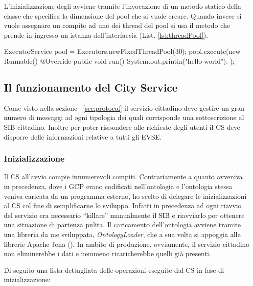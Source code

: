L'inizializzazione degli  avviene tramite l'invocazione di un metodo statico della classe  che specifica la dimensione del pool che si vuole creare. Quando invece si vuole assegnare un compito ad uno dei thread del pool si usa il metodo  che prende in ingresso un istanza dell'interfaccia  (List. \ref{lst:threadPool}).

\begin{java}[caption={Creazione Pool di Thread},label={lst:threadPool}]
ExecutorService pool = Executors.newFixedThreadPool(30);
pool.execute(new Runnable() {
	@Override
	public void run() {
		System.out.println("hello world");
	}
});
\end{java}

\subsection{Il funzionamento del City Service}
 
Come visto nella sezione ~\ref{sec:protocol} il servizio cittadino deve gestire un gran numero di messaggi ad ogni tipologia dei quali corrisponde una sottoscrizione al SIB cittadino. Inoltre per poter rispondere alle richieste degli utenti il CS deve disporre delle informazioni relative a tutti gli EVSE.

\subsubsection{Inizializzazione}\label{subsubsec:city-init}

Il CS all'avvio compie innumerevoli compiti. Contrariamente a quanto avveniva in precedenza, dove i GCP erano codificati nell'ontologia e l'ontologia stessa veniva caricata da un programma esterno, ho scelto di delegare le inizializzazioni al CS col fine di semplificarne lo sviluppo. Infatti in precedenza ad ogni riavvio del servizio era necessario ``killare'' manualmente il SIB e riavviarlo per ottenere una situazione di partenza pulita. Il caricamento dell'ontologia avviene tramite una libreria da me sviluppata, \emph{OntologyLoader}, che a sua volta si appoggia alle librerie Apache Jena (\cite{jena2011}). In ambito di produzione, ovviamente, il servizio cittadino non eliminerebbe i dati e nemmeno ricaricherebbe quelli già presenti.

Di seguito una lista dettagliata delle operazioni eseguite dal CS in fase di inizializzazione:

